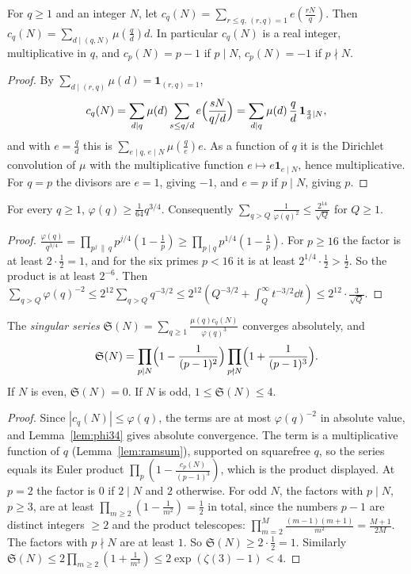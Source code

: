 \begin{lemma}\label{lem:ramsum}
For $q\ge1$ and an integer $N$, let $c_q(N)=\sum_{r\le q,\,(r,q)=1}e(\frac{rN}q)$. Then $c_q(N)=\sum_{d\mid(q,N)}\mu(\frac qd)d$. In particular $c_q(N)$ is a real integer, multiplicative in $q$, and $c_p(N)=p-1$ if $p\mid N$, $c_p(N)=-1$ if $p\nmid N$.
\end{lemma}
\begin{proof}
By $\sum_{d\mid(r,q)}\mu(d)=\mathbf 1_{(r,q)=1}$,
\[
c_q(N)=\sum_{d\mid q}\mu(d)\sum_{s\le q/d}e\Bigl(\frac{sN}{q/d}\Bigr)=\sum_{d\mid q}\mu(d)\,\frac qd\,\mathbf 1_{\frac qd\mid N},
\]
and with $e=\frac qd$ this is $\sum_{e\mid q,\,e\mid N}\mu(\frac qe)e$. As a function of $q$ it is the Dirichlet convolution of $\mu$ with the multiplicative function $e\mapsto e\mathbf 1_{e\mid N}$, hence multiplicative. For $q=p$ the divisors are $e=1$, giving $-1$, and $e=p$ if $p\mid N$, giving $p$.
\end{proof}

\begin{lemma}\label{lem:phi34}
For every $q\ge1$, $\varphi(q)\ge\frac1{64}q^{3/4}$. Consequently $\sum_{q>Q}\frac1{\varphi(q)^2}\le\frac{2^{14}}{\sqrt Q}$ for $Q\ge1$.
\end{lemma}
\begin{proof}
$\frac{\varphi(q)}{q^{3/4}}=\prod_{p^j\,\|\,q}p^{j/4}(1-\frac1p)\ge\prod_{p\mid q}p^{1/4}(1-\frac1p)$. For $p\ge16$ the factor is at least $2\cdot\frac12=1$, and for the six primes $p<16$ it is at least $2^{1/4}\cdot\frac12>\frac12$. So the product is at least $2^{-6}$. Then $\sum_{q>Q}\varphi(q)^{-2}\le2^{12}\sum_{q>Q}q^{-3/2}\le2^{12}(Q^{-3/2}+\int_Q^\infty t^{-3/2}\dd t)\le2^{12}\cdot\frac3{\sqrt Q}$.
\end{proof}

\begin{proposition}\label{prop:sing3}
The \emph{singular series} $\mathfrak S(N)=\sum_{q\ge1}\frac{\mu(q)c_q(N)}{\varphi(q)^3}$ converges absolutely, and
\[
\mathfrak S(N)=\prod_{p\mid N}\Bigl(1-\frac1{(p-1)^2}\Bigr)\prod_{p\nmid N}\Bigl(1+\frac1{(p-1)^3}\Bigr).
\]
If $N$ is even, $\mathfrak S(N)=0$. If $N$ is odd, $1\le\mathfrak S(N)\le4$.
\end{proposition}
\begin{proof}
Since $|c_q(N)|\le\varphi(q)$, the terms are at most $\varphi(q)^{-2}$ in absolute value, and Lemma~\ref{lem:phi34} gives absolute convergence. The term is a multiplicative function of $q$ (Lemma~\ref{lem:ramsum}), supported on squarefree $q$, so the series equals its Euler product $\prod_p(1-\frac{c_p(N)}{(p-1)^3})$, which is the product displayed. At $p=2$ the factor is $0$ if $2\mid N$ and $2$ otherwise. For odd $N$, the factors with $p\mid N$, $p\ge3$, are at least $\prod_{m\ge2}(1-\frac1{m^2})=\frac12$ in total, since the numbers $p-1$ are distinct integers $\ge2$ and the product telescopes: $\prod_{m=2}^M\frac{(m-1)(m+1)}{m^2}=\frac{M+1}{2M}$. The factors with $p\nmid N$ are at least $1$. So $\mathfrak S(N)\ge2\cdot\frac12=1$. Similarly $\mathfrak S(N)\le2\prod_{m\ge2}(1+\frac1{m^3})\le2\exp(\zeta(3)-1)<4$.
\end{proof}

